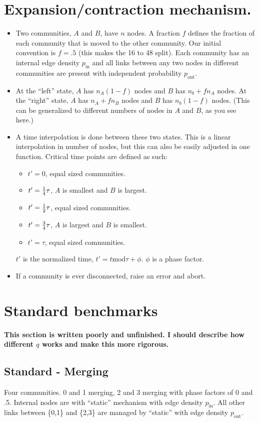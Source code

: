 \documentclass{article}
\def\pin{p_\mathrm{in}}
\def\pout{p_\mathrm{out}}
\begin{document}
\section{Expansion/contraction mechanism.}
\begin{itemize}
\item Two communities, $A$ and $B$, have $n$ nodes.  A fraction $f$
  defines the fraction of each community that is moved to the other
  community.  Our initial convention is $f=.5$ (this makes the 16 to
  48 split).  Each community has an
  internal edge density $\pin$ and all links between any two nodes in
  different communities are present with independent probability
  $\pout$.
\item At the ``left'' state, $A$ has $n_A(1-f)$ nodes and $B$ has
  $n_b+f n_A$ nodes.  At the ``right'' state, $A$ has $n_A + f n_B$
  nodes and $B$ has $n_b(1-f)$ nodes.  (This can be generalized to
  different numbers of nodes in $A$ and $B$, as you see here.)
\item A time interpolation is done between these two states.  This is
  a linear interpolation in number of nodes, but this can also be
  easily adjusted in one function.  Critical time points are defined
  as such:
  \begin{itemize}
  \item $t'=0$, equal sized communities.
  \item $t'={1 \over 4} \tau$, $A$ is smallest and $B$ is largest.
  \item $t'={1 \over 2} \tau$, equal sized communities.
  \item $t'={3 \over 4} \tau$, $A$ is largest and $B$ is smallest.
  \item $t'=\tau$, equal sized communities.
  \end{itemize}
  $t'$ is the normalized time, $t' = t \mathrm{mod} \tau + \phi$.  $\phi$ is a
  phase factor.
\item If a community is ever disconnected, raise an error and abort.
\end{itemize}



\section{Standard benchmarks}

\textbf{This section is written poorly and unfinished.  I should
  describe how different $q$ works and make this more rigorous.}

\subsection{Standard - Merging}
Four communities.  0 and 1 merging, 2 and 3 merging with phase
factors of 0 and .5.  Internal nodes are with ``static'' mechanism with
edge density $\pin$.  All other links between \{0,1\} and \{2,3\} are
managed by ``static'' with edge density $\pout$.
\end{document}
